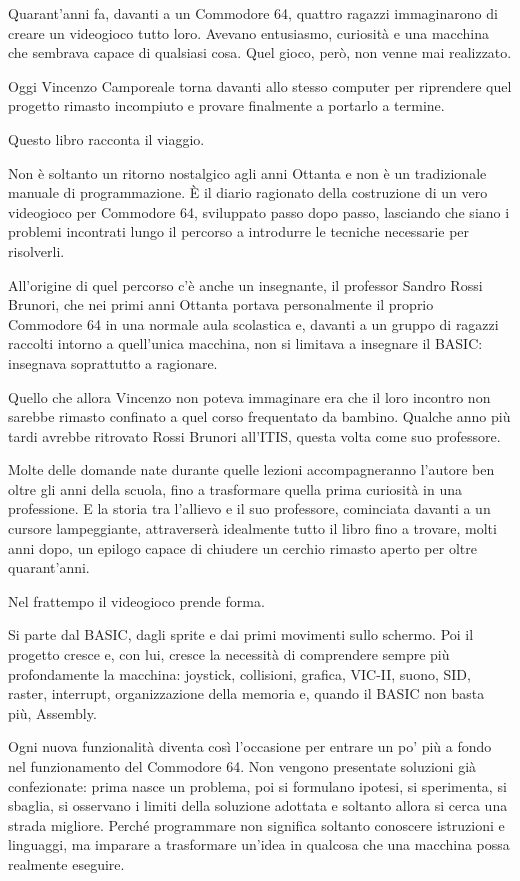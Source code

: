 \documentclass{article}
\author{utente}
\date{2026-08-20}
\begin{document}
Quarant'anni fa, davanti a un Commodore 64, quattro ragazzi immaginarono di creare un videogioco tutto loro. Avevano
entusiasmo, curiosità e una macchina che sembrava capace di qualsiasi cosa. Quel gioco, però, non venne mai realizzato.

Oggi Vincenzo Camporeale torna davanti allo stesso computer per riprendere quel progetto rimasto incompiuto e provare
finalmente a portarlo a termine.

Questo libro racconta il viaggio.

Non è soltanto un ritorno nostalgico agli anni Ottanta e non è un tradizionale manuale di programmazione. È il diario
ragionato della costruzione di un vero videogioco per Commodore 64, sviluppato passo dopo passo, lasciando che siano i
problemi incontrati lungo il percorso a introdurre le tecniche necessarie per risolverli.

All'origine di quel percorso c'è anche un insegnante, il professor Sandro Rossi Brunori, che nei primi anni Ottanta
portava personalmente il proprio Commodore 64 in una normale aula scolastica e, davanti a un gruppo di ragazzi raccolti
intorno a quell'unica macchina, non si limitava a insegnare il BASIC: insegnava soprattutto a ragionare.

Quello che allora Vincenzo non poteva immaginare era che il loro incontro non sarebbe rimasto confinato a quel corso
frequentato da bambino. Qualche anno più tardi avrebbe ritrovato Rossi Brunori all'ITIS, questa volta come suo
professore.

Molte delle domande nate durante quelle lezioni accompagneranno l'autore ben oltre gli anni della scuola, fino a
trasformare quella prima curiosità in una professione. E la storia tra l'allievo e il suo professore, cominciata
davanti a un cursore lampeggiante, attraverserà idealmente tutto il libro fino a trovare, molti anni dopo, un epilogo
capace di chiudere un cerchio rimasto aperto per oltre quarant'anni.

Nel frattempo il videogioco prende forma.

Si parte dal BASIC, dagli sprite e dai primi movimenti sullo schermo. Poi il progetto cresce e, con lui, cresce la
necessità di comprendere sempre più profondamente la macchina: joystick, collisioni, grafica, VIC-II, suono, SID,
raster, interrupt, organizzazione della memoria e, quando il BASIC non basta più, Assembly.

Ogni nuova funzionalità diventa così l'occasione per entrare un po' più a fondo nel funzionamento del Commodore 64. Non
vengono presentate soluzioni già confezionate: prima nasce un problema, poi si formulano ipotesi, si sperimenta, si
sbaglia, si osservano i limiti della soluzione adottata e soltanto allora si cerca una strada migliore. Perché
programmare non significa soltanto conoscere istruzioni e linguaggi, ma imparare a trasformare un'idea in qualcosa che
una macchina possa realmente eseguire.
\end{document}
